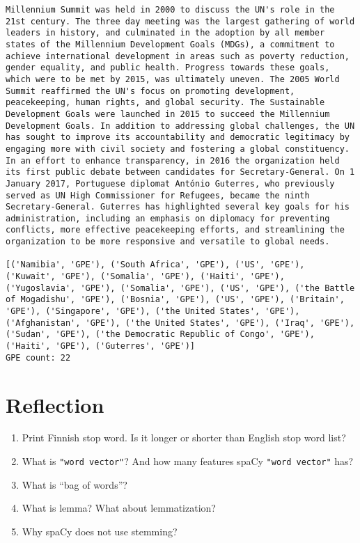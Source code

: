 \documentclass[11pt]{article}
\providecommand{\tightlist}{%
      \setlength{\itemsep}{0pt}\setlength{\parskip}{0pt}}
\begin{document}
\begin{Verbatim}[commandchars=\\\{\}]
Millennium Summit was held in 2000 to discuss the UN's role in the 21st century. The three day meeting was the largest gathering of world leaders in history, and culminated in the adoption by all member states of the Millennium Development Goals (MDGs), a commitment to achieve international development in areas such as poverty reduction, gender equality, and public health. Progress towards these goals, which were to be met by 2015, was ultimately uneven. The 2005 World Summit reaffirmed the UN's focus on promoting development, peacekeeping, human rights, and global security. The Sustainable Development Goals were launched in 2015 to succeed the Millennium Development Goals. In addition to addressing global challenges, the UN has sought to improve its accountability and democratic legitimacy by engaging more with civil society and fostering a global constituency. In an effort to enhance transparency, in 2016 the organization held its first public debate between candidates for Secretary-General. On 1 January 2017, Portuguese diplomat António Guterres, who previously served as UN High Commissioner for Refugees, became the ninth Secretary-General. Guterres has highlighted several key goals for his administration, including an emphasis on diplomacy for preventing conflicts, more effective peacekeeping efforts, and streamlining the organization to be more responsive and versatile to global needs.

[('Namibia', 'GPE'), ('South Africa', 'GPE'), ('US', 'GPE'), ('Kuwait', 'GPE'), ('Somalia', 'GPE'), ('Haiti', 'GPE'), ('Yugoslavia', 'GPE'), ('Somalia', 'GPE'), ('US', 'GPE'), ('the Battle of Mogadishu', 'GPE'), ('Bosnia', 'GPE'), ('US', 'GPE'), ('Britain', 'GPE'), ('Singapore', 'GPE'), ('the United States', 'GPE'), ('Afghanistan', 'GPE'), ('the United States', 'GPE'), ('Iraq', 'GPE'), ('Sudan', 'GPE'), ('the Democratic Republic of Congo', 'GPE'), ('Haiti', 'GPE'), ('Guterres', 'GPE')]
GPE count: 22

    \end{Verbatim}

    \hypertarget{reflection}{%
\section{Reflection}\label{reflection}}

\begin{enumerate}
\def\labelenumi{\arabic{enumi}.}
\tightlist
\item
  Print Finnish stop word. Is it longer or shorter than English stop
  word list?
\item
  What is \texttt{"word\ vector"}? And how many features spaCy
  \texttt{"word\ vector"} has?
\item
  What is ``bag of words''?
\item
  What is lemma? What about lemmatization?
\item
  Why spaCy does not use stemming?
\end{enumerate}
\end{document}
